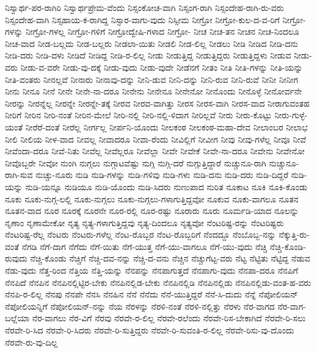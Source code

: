 {ನಿಸ್ವಾರ್ಥ-ಪರ-ರಾಗಿರಿ
ನಿಸ್ವಾರ್ಥಪ್ರೇಮ-ವೆಂದು
ನಿಸ್ಸಂಕೋಚ-ವಾಗಿ
ನಿಸ್ಸಂಗ-ರಾಗಿ
ನಿಸ್ಸಂದೇಹ-ರಾಗಿ-ರು-ವರು
ನಿಸ್ಸಂದೇಹ-ವಾಗಿ
ನಿಸ್ಸಹಾಯ-ಕ-ರಾಗಿದ್ದ
ನಿಸ್ಸಾರ-ವಾಗು-ವುದು
ನಿಸ್ಸೀಮ
ನೀಗ್ರೋ
ನೀಗ್ರೋ-ಕುಲ-ದ-ವ-ರಿಗೆ
ನೀಗ್ರೋ-ಗಳನ್ನು
ನೀಗ್ರೋ-ಗಳಲ್ಲ
ನೀಗ್ರೋ-ಗಳಿಗೆ
ನೀಗ್ರೋದ್ವೇಷಿ-ಗಳಾದ
ನೀಗ್ರೋ-
ನೀಚ
ನೀಚ-ತನ
ನೀಚನ
ನೀಚ-ನಿಂದಲೂ
ನೀಚ-ವಾದ
ನೀಡ-ಬಲ್ಲದು
ನೀಡ-ಬಲ್ಲರು
ನೀಡಲಾ-ಯಿತು
ನೀಡಲಿ
ನೀಡ-ಲಿಲ್ಲ
ನೀಡಲು
ನೀಡಿ
ನೀಡಿದ
ನೀಡಿ-ದನು
ನೀಡಿ-ದರು
ನೀಡಿ-ದಳು
ನೀಡಿದೆ
ನೀಡಿದ್ದ
ನೀಡಿ-ರ-ಲಿಲ್ಲ
ನೀಡು
ನೀಡುತ್ತಿದ್ದ
ನೀಡುತ್ತಿದ್ದರು
ನೀಡುತ್ತಿದ್ದಳು
ನೀಡುವ
ನೀಡು-ವರು
ನೀಡು-ವ-ವರೇ
ನೀಡು-ವು-ದಕ್ಕೆ
ನೀಡು-ವುದು
ನೀಡು-ವುದೇ
ನೀಡೆನಗೆ
ನೀತಂ
ನೀತಿ
ನೀತಿ-ಗಳನ್ನು
ನೀತಿ-ಯನ್ನು
ನೀತಿ-ವಂತರು
ನೀನಲ್ಲವೆ
ನೀನಾರು
ನೀನಾವು-ದನ್ನು
ನೀನಿ-ಡುವ
ನೀನಿ-ದನ್ನು
ನೀನಿ-ರುವ
ನೀನಿ-ರುವೆ
ನೀನೀ
ನೀನೀಗ
ನೀನು
ನೀನೂ
ನೀನೆ
ನೀನೇ
ನೀನೇ-ನಾ-ದರೂ
ನೀನೇನು
ನೀನೇನೂ
ನೀನೇನೋ
ನೀನೊಂದು
ನೀನೊಳ್ಳೆ
ನೀನೋರ್ವನೇ
ನೀರನ್ನು
ನೀರನ್ನೆಲ್ಲ
ನೀರನ್ನೇ
ನೀರನ್ನೇ-ತಕ್ಕೆ
ನೀರವ
ನೀರವ-ವಾಗಿತ್ತು
ನೀರಸ
ನೀರಸ-ವಾಗಿ
ನೀರಸ-ವಾದ
ನೀರಾಗುವಂತಹ
ನೀರಿಗೆ
ನೀರಿನ
ನೀರಿ-ನಂತೆ
ನೀರಿನ-ಮೇಲೆ
ನೀರಿ-ನಲ್ಲಿ
ನೀರಿ-ನಲ್ಲಿ-ಳಿದಾಗ
ನೀರಿಲ್ಲವೆ
ನೀರು
ನೀರು-ಕೊಟ್ಟು
ನೀರು-ಗುಳ್ಳೆ-ಯಂತೆ
ನೀರೆರೆ-ದಂತೆ
ನೀರೆಲ್ಲ
ನೀರ್ಗಲ್ಲ
ನೀರ್ಪನಿ-ಯೊಂದು
ನೀಲಕಂಠ
ನೀಲಕಂಠ-ಮಹಾ-ದೇವ
ನೀಲಾಂಬರ
ನೀಲಾಭ
ನೀಲಿ
ನೀಲಿಯ
ನೀಳ-ವಾದ
ನೀವಲ್ಲ
ನೀವಾದರೂ
ನೀವಾ-ರೆಂದು
ನೀವಿಲ್ಲಿಗೆ
ನೀವೀಗ
ನೀವು
ನೀವು-ಗಳೆಲ್ಲ
ನೀವೂ
ನೀವೆ
ನೀವೆಂದಾ-ದರೂ
ನೀವೆ-ನಿತು
ನೀವೆಲ್ಲ
ನೀವೆಲ್ಲರೂ
ನೀವೆಲ್ಲಾ
ನೀವೇ
ನೀವೇಕೆ
ನೀವೇ-ನಾ-ದರೂ
ನೀವೇನು
ನೀವೇನೋ
ನೀವೊಬ್ಬರೇ
ನೀವೋ
ನುಂಗಿ
ನುಗ್ಗಲು
ನುಗ್ಗಾಟವೆಷ್ಟು
ನುಗ್ಗಿ
ನುಗ್ಗಿ-ದರೆ
ನುಗ್ಗುತ್ತಿದ್ದಾರೆ
ನುಚ್ಚುನೂ-ರಾಗಿ
ನುಚ್ಚುನೂ-ರಾಗಿ-ಸುವ
ನುಚ್ಚು-ನೂರು
ನುಡಿ
ನುಡಿ-ಗಳನ್ನು
ನುಡಿ-ಗಳಿವು
ನುಡಿ-ಗಳು
ನುಡಿ-ದನು
ನುಡಿ-ದರು
ನುಡಿ-ದಿದ್ದರೆ
ನುಡಿ-ಯನ್ನು
ನುಡಿ-ಯನ್ನೂ
ನುಡಿಯೂ
ನುಡಿ-ಯೊಂದು
ನುಡಿ-ಸಿದರು
ನುಣುಪಾದ
ನುರಿತ
ನೂಕಾಟ
ನೂಕಿ
ನೂಕಿ-ಕೊಂಡು
ನೂಕು
ನೂಕು-ನುಗ್ಗ-ಲಲ್ಲಿ
ನೂಕು-ನುಗ್ಗಲು
ನೂಕು-ನುಗ್ಗಲು-ಗಳಾಗುತ್ತಿದ್ದವೋ
ನೂಕುವ
ನೂಕು-ವಾಗಲೂ
ನೂತನ
ನೂತನ-ವಾದ
ನೂರ
ನೂರಕ್ಕೆ
ನೂರನೇ
ನೂರ-ರಲ್ಲಿ
ನೂರ-ರಷ್ಟು
ನೂರಾರು
ನೂರು
ನೂರ್ಮಡಿ-ಯಾದ
ನೂಲನ್ನು
ನೃಣಾಂ
ನೃಣಾಮೇಕೋ
ನೃತ್ಯ
ನೃತ್ಯ-ಗಳಾಗುತ್ತಿದ್ದವು
ನೃತ್ಯ-ದಿಂದಲೂ
ನೃತ್ಯವೋ
ನೆಂಟರಿಷ್ಟ-ರನ್ನು
ನೆಂಟರಿಷ್ಟರು
ನೆಂಟರಿಷ್ಟ-ರೆಲ್ಲ
ನೆಂಟರು
ನೆಂಟರು-ಗಳೆಲ್ಲ
ನೆಂಟ-ರೊಬ್ಬರ
ನೆಂಟ-ರೊಬ್ಬರಿಗೆ
ನೆಂದದ್ದೂ
ನೆಂಬೊಬ್ಬ-ನನ್ನು
ನೆಕ್ಕುತ್ತಿ-ರು-ವಂತೆ
ನೆಗಡಿ
ನೆಗೆ-ದಾಗ
ನೆಗೆದು
ನೆಗೆ-ಯಿತು
ನೆಗೆ-ಯುತ್ತ
ನೆಗೆ-ಯು-ವಾಗಲೂ
ನೆಗೆ-ಯು-ವುದು
ನೆಚ್ಚಿ
ನೆಚ್ಚಿ-ಕೊಂಡಿ-ರುವುದು
ನೆಚ್ಚಿ-ಕೊಂಡು
ನೆಚ್ಚಿಗೆ
ನೆಚ್ಚಿ-ದವ-ನನ್ನು
ನೆಚ್ಚಿ-ದ-ವನು
ನೆಚ್ಚಿನ
ನೆಚ್ಚುಗೆಟ್ಟ-ವರು
ನೆಟ್ಟ
ನೆಟ್ಟಿತು
ನೆಟ್ಟಿದ್ದ
ನೆಡುವ
ನೆಡು-ವುದು
ನೆತ್ತ-ರಿಂದ
ನೆತ್ತಿಯ
ನೆತ್ತಿ-ಯನ್ನು
ನೆನಪನ್ನು
ನೆನಪಾಗುತ್ತದೆ
ನೆನಪಾಗು-ವುದು
ನೆನಪಾ-ದರೂ
ನೆನಪಿಗೆ
ನೆನಪಿದೆ
ನೆನಪಿನ
ನೆನಪಿನಲ್ಲಿಟ್ಟಿರ-ಬೇಕು
ನೆನಪಿನಲ್ಲಿಡ-ಬೇಕು
ನೆನಪಿನಲ್ಲಿಡಿ
ನೆನಪಿನಲ್ಲಿಡು
ನೆನಪಿನಲ್ಲಿಡು-ವಂತ-ಹ-ವರು
ನೆನಪಿ-ರ-ಲಿಲ್ಲ
ನೆನಪು
ನೆನಪೇ
ನೆನಸಿ
ನೆನಹಿನ
ನೆನೆ
ನೆನೆದು
ನೆನೆ-ಯುತ್ತಿದ್ದರೆ
ನೆನೆ-ಸಿ-ದುದು
ನೆನ್ನೆ
ನೆಪೋಲಿಯನ್
ನೆಪೋಲಿಯನ್ನಿಗೆ
ನೆಪೋಲಿಯನ್-ನನ್ನು
ನೆಯ
ನೆರಳನ್ನು
ನೆರಳಿ-ನಂತೆ
ನೆರಳಿ-ನಲ್ಲಿತ್ತು
ನೆರಳು
ನೆರ-ವಾಗದ
ನೆರ-ವಾಗ-ಬಲ್ಲೆಯಾ
ನೆರ-ವಾಗಲು
ನೆರ-ವಿಗೆ
ನೆರವು
ನೆರವೇ-ರ-ಲಿಲ್ಲ
ನೆರವೇ-ರಲೆಂದು
ನೆರವೇ-ರಿಸ-ಬೇಕಾಗಿದೆ
ನೆರವೇ-ರಿ-ಸಲು
ನೆರವೇ-ರಿ-ಸಿದ
ನೆರವೇ-ರಿ-ಸಿದರು
ನೆರವೇ-ರಿ-ಸುತ್ತಿದ್ದರು
ನೆರವೇ-ರಿ-ಸುವಂತಿ-ರ-ಲಿಲ್ಲ
ನೆರವೇ-ರಿಸು-ವು-ದೊಂದು
ನೆರವೇ-ರು-ವು-ದಿಲ್ಲ
}
